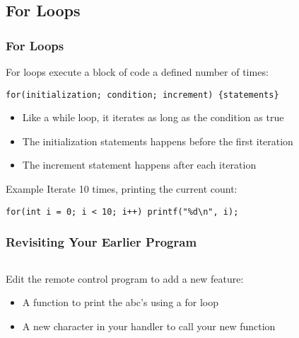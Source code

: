 \subsection{For Loops}
\label{sub:for_loops}
\begin{frame}[fragile]
	\frametitle{For Loops}
	For loops execute a block of code a defined number of times:
	\begin{lstlisting}[numbers=none]
		for(initialization; condition; increment) {statements}
	\end{lstlisting}
	\vfill
	\begin{itemize}
		\item Like a while loop, it iterates as long as the condition as true
		\item The initialization statements happens before the first iteration
		\item The increment statement happens after each iteration
	\end{itemize}
	\vfill
	\begin{block}{Example}
		Iterate 10 times, printing the current count:
		\begin{lstlisting}[numbers=none]
			for(int i = 0; i < 10; i++) printf("%d\n", i);
		\end{lstlisting}
	\end{block}
\end{frame}

\begin{frame}[fragile]
	\frametitle{Revisiting Your Earlier Program}
	\begin{columns}[T]
		\begin{column}{0.4\textwidth}
			Edit the remote control program to add a new feature:
			\begin{itemize}
				\item A function to print the abc's using a for loop
				\item A new character in your handler to call your new function
			\end{itemize}
			\pause
		\end{column}
		\begin{column}{0.6\textwidth}
			
		\end{column}
	\end{columns}
\end{frame}